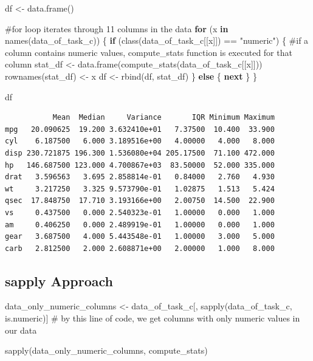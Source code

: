 \documentclass[
  letterpaper,
  DIV=11,
  numbers=noendperiod]{scrartcl}
\newenvironment{Shaded}{\begin{snugshade}}{\end{snugshade}}
\newcommand{\CommentTok}[1]{\textcolor[rgb]{0.37,0.37,0.37}{#1}}
\newcommand{\ControlFlowTok}[1]{\textcolor[rgb]{0.00,0.23,0.31}{\textbf{#1}}}
\newcommand{\FunctionTok}[1]{\textcolor[rgb]{0.28,0.35,0.67}{#1}}
\newcommand{\NormalTok}[1]{\textcolor[rgb]{0.00,0.23,0.31}{#1}}
\newcommand{\OtherTok}[1]{\textcolor[rgb]{0.00,0.23,0.31}{#1}}
\newcommand{\SpecialCharTok}[1]{\textcolor[rgb]{0.37,0.37,0.37}{#1}}
\newcommand{\StringTok}[1]{\textcolor[rgb]{0.13,0.47,0.30}{#1}}
\begin{document}
\begin{Shaded}
\begin{Highlighting}[]
\NormalTok{df }\OtherTok{\textless{}{-}} \FunctionTok{data.frame}\NormalTok{()}


\CommentTok{\#for loop iterates through 11 columns in the data}
\ControlFlowTok{for}\NormalTok{ (x }\ControlFlowTok{in} \FunctionTok{names}\NormalTok{(data\_of\_task\_c)) \{}
  \ControlFlowTok{if}\NormalTok{ (}\FunctionTok{class}\NormalTok{(data\_of\_task\_c[[x]]) }\SpecialCharTok{==} \StringTok{"numeric"}\NormalTok{) \{ }\CommentTok{\#if a column contains numeric values, compute\_stats function is executed for that column}
\NormalTok{    stat\_df }\OtherTok{\textless{}{-}} \FunctionTok{data.frame}\NormalTok{(}\FunctionTok{compute\_stats}\NormalTok{(data\_of\_task\_c[[x]]))}
    \FunctionTok{rownames}\NormalTok{(stat\_df) }\OtherTok{\textless{}{-}}\NormalTok{ x}
\NormalTok{    df }\OtherTok{\textless{}{-}} \FunctionTok{rbind}\NormalTok{(df, stat\_df)}
\NormalTok{  \}}
  \ControlFlowTok{else}\NormalTok{ \{}
    \ControlFlowTok{next}
\NormalTok{  \}}
\NormalTok{\}}

\NormalTok{df}
\end{Highlighting}
\end{Shaded}

\begin{verbatim}
           Mean  Median     Variance       IQR Minimum Maximum
mpg   20.090625  19.200 3.632410e+01   7.37500  10.400  33.900
cyl    6.187500   6.000 3.189516e+00   4.00000   4.000   8.000
disp 230.721875 196.300 1.536080e+04 205.17500  71.100 472.000
hp   146.687500 123.000 4.700867e+03  83.50000  52.000 335.000
drat   3.596563   3.695 2.858814e-01   0.84000   2.760   4.930
wt     3.217250   3.325 9.573790e-01   1.02875   1.513   5.424
qsec  17.848750  17.710 3.193166e+00   2.00750  14.500  22.900
vs     0.437500   0.000 2.540323e-01   1.00000   0.000   1.000
am     0.406250   0.000 2.489919e-01   1.00000   0.000   1.000
gear   3.687500   4.000 5.443548e-01   1.00000   3.000   5.000
carb   2.812500   2.000 2.608871e+00   2.00000   1.000   8.000
\end{verbatim}

\subsection{sapply Approach}\label{sapply-approach}

\begin{Shaded}
\begin{Highlighting}[]
\NormalTok{data\_only\_numeric\_columns }\OtherTok{\textless{}{-}}\NormalTok{ data\_of\_task\_c[, }\FunctionTok{sapply}\NormalTok{(data\_of\_task\_c, is.numeric)] }\CommentTok{\# by this line of code, we get columns with only numeric values in our data}

\FunctionTok{sapply}\NormalTok{(data\_only\_numeric\_columns, compute\_stats)}
\end{Highlighting}
\end{Shaded}
\end{document}

